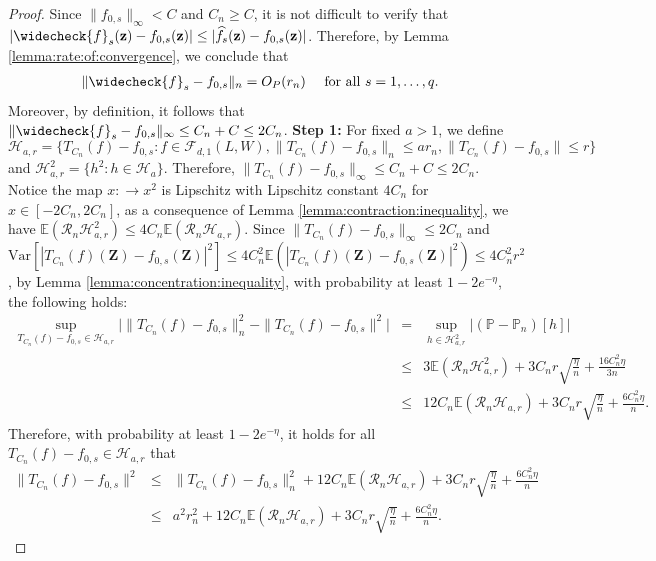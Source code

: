 \documentclass[11pt, preprint]{imsart}
\numberwithin{equation}{section}
\def \mcF{\mathcal{F}}
\def \mcH{\mathcal{H}}
\def \mcRn{\mathcal{R}_n}
\def \bfZ{\mathbf{Z}}
\def \bfz{\mathbf{z}}
\def \ev{\mathbb{E}}
\def \pr{\mathbb{P}}
\theoremstyle{plain}
\theoremstyle{definition}
\begin{document}
\begin{proof}
Since $\|f_{0,s}\|_\infty<C$ and $C_n\geq C$, it is not difficult to verify that $|\widecheck{f}_s(\bfz)-f_{0,s}(\bfz)|\leq |\widehat{f}_s(\bfz)-f_{0,s}(\bfz)|$. Therefore, by Lemma \ref{lemma:rate:of:convergence}, we conclude that
\begin{eqnarray}
	\|\widecheck{f}_s-f_{0,s}\|_n=O_P(r_n)\quad \textrm{ for all } s=1,\ldots, q.\nonumber
\end{eqnarray}
Moreover, by definition, it follows that $\|\widecheck{f}_s-f_{0,s}\|_\infty\leq C_n+C\leq 2C_n$. 
\newline
\noindent \textbf{Step 1:}
For fixed $a>1$, we define 
\begin{equation*}
	\mcH_{a,r}=\{T_{C_n}(f)-f_{0,s}: f\in \mcF_{d,1}(L, W),\|T_{C_n}(f)-f_{0,s}\|_n\leq ar_n  ,\|T_{C_n}(f)-f_{0,s}\|\leq r\}
\end{equation*}
and $\mcH_{a,r}^2=\{h^2: h\in \mcH_a\}$. Therefore, $\|T_{C_n}(f)-f_{0,s}\|_\infty\leq C_n+C\leq 2C_n$. Notice the map $x:\to x^2$ is Lipschitz with Lipschitz constant  $4C_n$ for $x\in [-2C_n, 2C_n]$,  as a consequence of  Lemma \ref{lemma:contraction:inequality}, we have $\ev(\mcRn\mcH_{a,r}^2)\leq 4C_n\ev(\mcRn\mcH_{a,r})$.  Since $\|T_{C_n}(f)-f_{0,s}\|_\infty\leq 2C_n$ and $\textrm{Var}[|T_{C_n}(f)(\bfZ)-f_{0,s}(\bfZ)|^2]\leq 4C_n^2\ev(|T_{C_n}(f)(\bfZ)-f_{0,s}(\bfZ)|^2)\leq 4C_n^2r^2$, 	by Lemma \ref{lemma:concentration:inequality}, with probability at least $1-2e^{-\eta}$, the following holds:
\begin{eqnarray}
	\sup_{T_{C_n}(f)-f_{0,s}\in \mcH_{a,r}}\bigg|\|T_{C_n}(f)-f_{0,s}\|_n^2-\|T_{C_n}(f)-f_{0,s}\|^2\bigg|&=&\sup_{h\in \mcH_{a,r}^2}\bigg|(\pr-\pr_n)[h]\bigg|\nonumber\\
	&\leq&3	\ev(\mcRn\mcH_{a,r}^2)+3C_nr\sqrt{\frac{\eta}{n}}+\frac{16C_n^2\eta}{3n}\nonumber\\
	&\leq& 12C_n\ev(\mcRn\mcH_{a,r})+3C_nr\sqrt{\frac{\eta}{n}}+\frac{6C_n^2\eta}{n}.\nonumber%
\end{eqnarray}
Therefore, with probability at least $1-2e^{-\eta}$, it holds for all $T_{C_n}(f)-f_{0,s}\in \mcH_{a,r}$ that
\begin{eqnarray}
	\|T_{C_n}(f)-f_{0,s}\|^2&\leq&\|T_{C_n}(f)-f_{0,s}\|_n^2+12C_n\ev(\mcRn\mcH_{a,r})+3C_nr\sqrt{\frac{\eta}{n}}+\frac{6C_n^2\eta}{n}\nonumber\\
	&\leq& a^2r_n^2+12C_n\ev(\mcRn\mcH_{a,r})+3C_nr\sqrt{\frac{\eta}{n}}+\frac{6C_n^2\eta}{n}.\label{eq:lemma:convergence:truncated:DNN:step1:eq1}

\end{eqnarray}
\end{proof}
\end{document}
